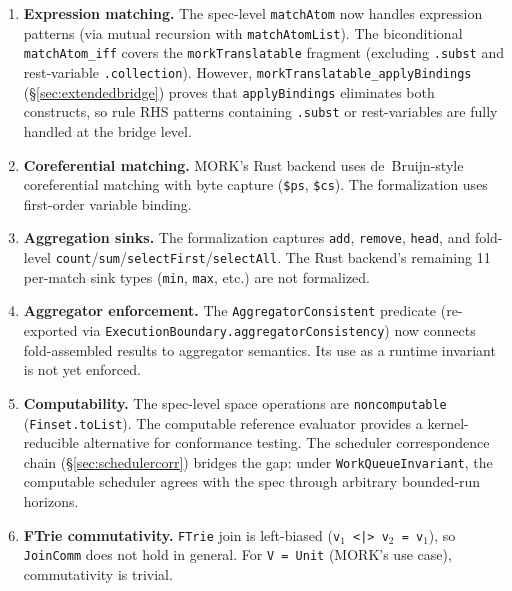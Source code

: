 \documentclass[11pt]{article}
\theoremstyle{definition}
\theoremstyle{remark}
\newcommand{\MORK}{\textup{MORK}}
\begin{document}
\begin{enumerate}
  \item \textbf{Expression matching.}
    The spec-level \texttt{matchAtom} now handles expression patterns
    (via mutual recursion with \texttt{matchAtomList}).
    The biconditional \texttt{matchAtom\_iff} covers the
    \texttt{morkTranslatable} fragment (excluding \texttt{.subst} and
    rest-variable \texttt{.collection}).  However,
    \texttt{morkTranslatable\_applyBindings}
    (\S\ref{sec:extendedbridge}) proves that \texttt{applyBindings}
    eliminates both constructs, so rule RHS patterns containing
    \texttt{.subst} or rest-variables are fully handled at the
    bridge level.

  \item \textbf{Coreferential matching.}
    \MORK{}'s Rust backend uses de~Bruijn-style coreferential matching with
    byte capture (\texttt{\$ps}, \texttt{\$cs}).
    The formalization uses first-order variable binding.

  \item \textbf{Aggregation sinks.}
    The formalization captures \texttt{add}, \texttt{remove}, \texttt{head},
    and fold-level \texttt{count}/\texttt{sum}/\texttt{selectFirst}/\texttt{selectAll}.
    The Rust backend's remaining 11 per-match sink types
    (\texttt{min}, \texttt{max}, etc.) are not formalized.

  \item \textbf{Aggregator enforcement.}
    The \texttt{AggregatorConsistent} predicate
    (re-exported via \texttt{ExecutionBoundary.aggregatorConsistency})
    now connects fold-assembled results to aggregator semantics.
    Its use as a runtime invariant is not yet enforced.

  \item \textbf{Computability.}
    The spec-level space operations are \texttt{noncomputable}
    (\texttt{Finset.toList}).  The computable reference evaluator provides
    a kernel-reducible alternative for conformance testing.
    The scheduler correspondence chain
    (\S\ref{sec:schedulercorr}) bridges the gap: under
    \texttt{WorkQueueInvariant}, the computable scheduler agrees with
    the spec through arbitrary bounded-run horizons.

  \item \textbf{FTrie commutativity.}
    \texttt{FTrie} join is left-biased (\texttt{v$_1$ <|> v$_2$ = v$_1$}),
    so \texttt{JoinComm} does not hold in general.
    For \texttt{V = Unit} (\MORK{}'s use case), commutativity is trivial.


\end{enumerate}
\end{document}

